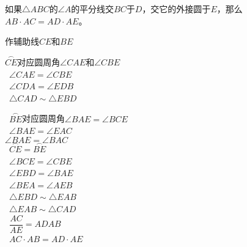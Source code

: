 \documentclass[answers]{exam}
\begin{document}
\begin{questions}
	\question 如果$\triangle{ABC}$的$\angle{A}$的平分线交$BC$于$D$，交它的外接圆于$E$，那么$AB\cdot AC = AD \cdot AE$。
	\begin{figure*}[htbp]
		\centering
	\end{figure*}
	\begin{solution}
		\begin{mathenum}
			\item 作辅助线$CE$和$BE$
			\item \because $\overset{\frown}{CE}$对应圆周角$\angle{CAE}$和$\angle{CBE}$
			\\ \therefore\ $\angle{CAE} = \angle{CBE}$
			\\ \because\ $\angle{CDA} = \angle{EDB} $
			\\ \therefore\ $\triangle{CAD} \sim \triangle{EBD}$
			\item \because\ $\overset{\frown}{BE}$对应圆周角$\angle{BAE} = \angle{BCE}$
			\\ \therefore\ $\angle{BAE} = \angle{EAC}$
			\\ \because $\angle{BAE} = \angle{BAC}$
			\\ \therefore\ $\overset{\frown}{CE} = \overset{\frown}{BE}$
			\\ \therefore\ $\angle{BCE} = \angle{CBE}$
			\\ \therefore\ $\angle{EBD} = \angle{BAE}$
			\\ \because\ $\angle{BEA} = \angle{AEB}$
			\\ \therefore\ $\triangle{EBD} \sim \triangle{EAB}$
			\\ \therefore\ $\triangle{EAB} \sim \triangle{CAD}$
			\\ \therefore\ $\dfrac{AC}{AE}={AD}{AB}$
			\\ \therefore\ $AC\cdot AB = AD\cdot AE$
		\end{mathenum}


\end{solution}
\end{questions}
\end{document}
